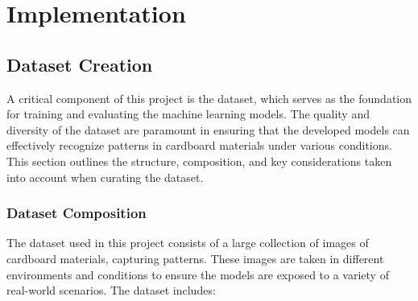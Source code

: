 \renewcommand\lstlistingname{Source Code}
\renewcommand\lstlistlistingname{Source Code}




\chapter{Implementation}
\label{c:implementation}



\section{Dataset Creation}

A critical component of this project is the dataset, which serves as the foundation for training and evaluating the machine learning models. The quality and diversity of the dataset are paramount in ensuring that the developed models can effectively recognize patterns in cardboard materials under various conditions. This section outlines the structure, composition, and key considerations taken into account when curating the dataset.

\subsection{Dataset Composition}

The dataset used in this project consists of a large collection of images of cardboard materials, capturing patterns. These images are taken in different environments and conditions to ensure the models are exposed to a variety of real-world scenarios. The dataset includes:

